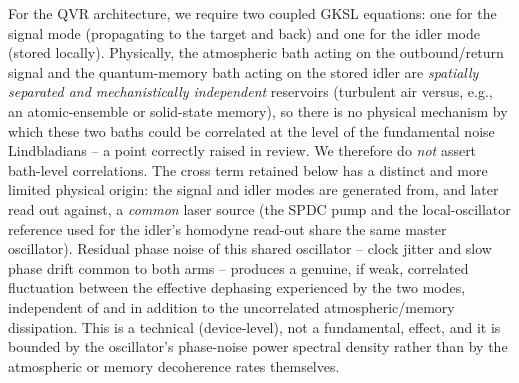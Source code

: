 \documentclass[journal]{IEEEtran}
\begin{document}
For the QVR architecture, we require two coupled GKSL equations: one for the signal mode (propagating to the target and back) and one for the idler mode (stored locally). Physically, the atmospheric bath acting on the outbound/return signal and the quantum-memory bath acting on the stored idler are \emph{spatially separated and mechanistically independent} reservoirs (turbulent air versus, e.g., an atomic-ensemble or solid-state memory), so there is no physical mechanism by which these two baths could be correlated at the level of the fundamental noise Lindbladians -- a point correctly raised in review. We therefore do \emph{not} assert bath-level correlations. The cross term retained below has a distinct and more limited physical origin: the signal and idler modes are generated from, and later read out against, a \emph{common} laser source (the SPDC pump and the local-oscillator reference used for the idler's homodyne read-out share the same master oscillator). Residual phase noise of this shared oscillator -- clock jitter and slow phase drift common to both arms -- produces a genuine, if weak, correlated fluctuation between the effective dephasing experienced by the two modes, independent of and in addition to the uncorrelated atmospheric/memory dissipation. This is a technical (device-level), not a fundamental, effect, and it is bounded by the oscillator's phase-noise power spectral density rather than by the atmospheric or memory decoherence rates themselves.
\end{document}
